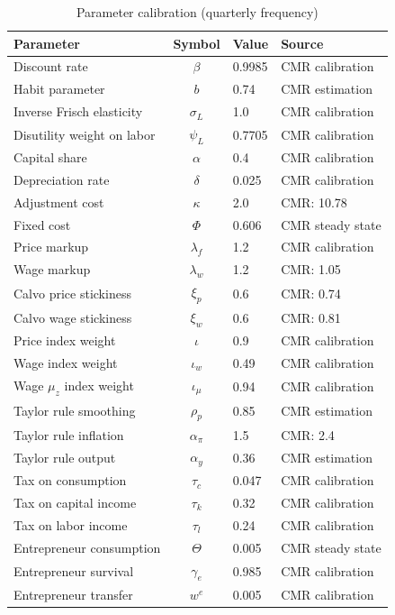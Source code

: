\documentclass[11pt]{article}
\begin{document}
\begin{table}[h!]
\centering
\caption{Parameter calibration (quarterly frequency)}
\label{tab:calibration}
\begin{tabular}{lcll}
\toprule
Parameter & Symbol & Value & Source \\
\midrule
Discount rate & $\beta$ & 0.9985 & CMR calibration \\
Habit parameter & $b$ & 0.74 & CMR estimation \\
Inverse Frisch elasticity & $\sigma_L$ & 1.0 & CMR calibration \\
Disutility weight on labor & $\psi_L$ & 0.7705 & CMR calibration \\[3pt]
Capital share & $\alpha$ & 0.4 & CMR calibration \\
Depreciation rate & $\delta$ & 0.025 & CMR calibration \\
Adjustment cost & $\kappa$ & 2.0 & CMR: 10.78 \\
Fixed cost & $\Phi$ & 0.606 & CMR steady state \\[3pt]
Price markup & $\lambda_f$ & 1.2 & CMR calibration \\
Wage markup & $\lambda_w$ & 1.2 & CMR: 1.05 \\
Calvo price stickiness & $\xi_p$ & 0.6 & CMR: 0.74 \\
Calvo wage stickiness & $\xi_w$ & 0.6 & CMR: 0.81 \\
Price index weight & $\iota$ & 0.9 & CMR calibration \\
Wage index weight & $\iota_w$ & 0.49 & CMR calibration \\
Wage $\mu_z$ index weight & $\iota_\mu$ & 0.94 & CMR calibration \\[3pt]
Taylor rule smoothing & $\rho_p$ & 0.85 & CMR estimation \\
Taylor rule inflation & $\alpha_\pi$ & 1.5 & CMR: 2.4 \\
Taylor rule output & $\alpha_y$ & 0.36 & CMR estimation \\[3pt]
Tax on consumption & $\tau_c$ & 0.047 & CMR calibration \\
Tax on capital income & $\tau_k$ & 0.32 & CMR calibration \\
Tax on labor income & $\tau_l$ & 0.24 & CMR calibration \\[3pt]
Entrepreneur consumption & $\Theta$ & 0.005 & CMR steady state \\
Entrepreneur survival & $\gamma_e$ & 0.985 & CMR calibration \\
Entrepreneur transfer & $w^e$ & 0.005 & CMR calibration \\

\end{tabular}
\end{table}
\end{document}
